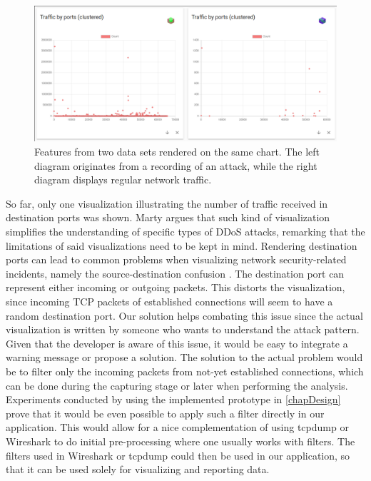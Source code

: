 \begin{figure}[]
    \centering
    \includegraphics[width=15cm]{images/evaluation_different_datasets_same_visualization.png}
    \caption{Features from two data sets rendered on the same chart. The left diagram originates from a recording of an attack, while the right diagram displays regular network traffic.}
    \label{fig:datasettilesop}
\end{figure}
So far, only one visualization illustrating the number of traffic received in destination ports was shown.
Marty argues that such kind of visualization simplifies the understanding of specific types of DDoS attacks, remarking that the limitations of said visualizations need to be kept in mind. Rendering destination ports can lead to common problems when visualizing network security-related incidents, namely the source-destination confusion \cite{appliedsecurityvisualization}. The destination port can represent either incoming or outgoing packets. This distorts the visualization, since incoming TCP packets of established connections will seem to have a random destination port. Our solution helps combating this issue since the actual visualization is written by someone who wants to understand the attack pattern. Given that the developer is aware of this issue, it would be easy to integrate a warning message or propose a solution. The solution to the actual problem would be to filter only the incoming packets from not-yet established connections, which can be done during the capturing stage or later when performing the analysis. Experiments conducted by using the implemented prototype in \ref{chapDesign} prove that it would be even possible to apply such a filter directly in our application. This would allow for a nice complementation of using tcpdump or Wireshark to do initial pre-processing where one usually works with filters. The filters used in Wireshark or tcpdump could then be used in our application, so that it can be used solely for visualizing and reporting data.

